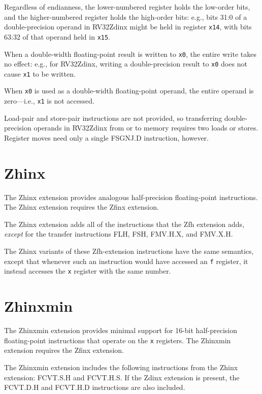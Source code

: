 Regardless of endianness, the lower-numbered register holds the low-order
bits, and the higher-numbered register holds the high-order bits: e.g., bits
31:0 of a double-precision operand in RV32Zdinx might be held in register
{\tt x14}, with bits 63:32 of that operand held in {\tt x15}.

When a double-width floating-point result is written to {\tt x0}, the entire
write takes no effect: e.g., for RV32Zdinx, writing a double-precision result
to {\tt x0} does not cause {\tt x1} to be written.

When {\tt x0} is used as a double-width floating-point operand, the entire
operand is zero---i.e., {\tt x1} is not accessed.

\begin{commentary}
Load-pair and store-pair instructions are not provided, so transferring
double-precision operands in RV32Zdinx from or to memory requires
two loads or stores.
Register moves need only a single FSGNJ.D instruction, however.
\end{commentary}

\section{Zhinx}

The Zhinx extension provides analogous half-precision floating-point
instructions.
The Zhinx extension requires the Zfinx extension.

The Zhinx extension adds all of the instructions that the Zfh extension
adds, {\em except} for the transfer instructions FLH, FSH, FMV.H.X,
and FMV.X.H.

The Zhinx variants of these Zfh-extension instructions have the same semantics,
except that whenever such an instruction would have accessed an {\tt f}
register, it instead accesses the {\tt x} register with the same number.

\section{Zhinxmin}

The Zhinxmin extension provides minimal support for 16-bit half-precision
floating-point instructions that operate on the {\tt x} registers.
The Zhinxmin extension requires the Zfinx extension.

The Zhinxmin extension includes the following instructions from the Zhinx
extension: FCVT.S.H and FCVT.H.S.
If the Zdinx extension is present, the FCVT.D.H and FCVT.H.D instructions are
also included.


